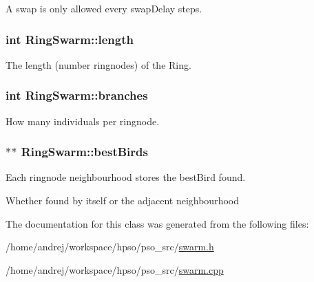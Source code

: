 A swap is only allowed every swapDelay steps. 

\hypertarget{classRingSwarm_ab4a1218eb2ea7858a4172370f5b51b4}{
\subsubsection{\setlength{\rightskip}{0pt plus 5cm}int {\bf RingSwarm::length}}}
\label{classRingSwarm_ab4a1218eb2ea7858a4172370f5b51b4}


The length (number ringnodes) of the Ring. 

\hypertarget{classRingSwarm_f187d6157f05bba9d56617e47afcd11c}{
\subsubsection{\setlength{\rightskip}{0pt plus 5cm}int {\bf RingSwarm::branches}}}
\label{classRingSwarm_f187d6157f05bba9d56617e47afcd11c}


How many individuals per ringnode. 

\hypertarget{classRingSwarm_91d5d5b8fb3bfcb3e59d0724171fc894}{
\subsubsection{$\ast$$\ast$ {\bf RingSwarm::bestBirds}}}
\label{classRingSwarm_91d5d5b8fb3bfcb3e59d0724171fc894}


Each ringnode neighbourhood stores the bestBird found. 

Whether found by itself or the adjacent neighbourhood 

The documentation for this class was generated from the following files:\begin{CompactItemize}
\item 
/home/andrej/workspace/hpso/pso\_\-src/\hyperlink{swarm_8h}{swarm.h}\item 
/home/andrej/workspace/hpso/pso\_\-src/\hyperlink{swarm_8cpp}{swarm.cpp}\end{CompactItemize}
